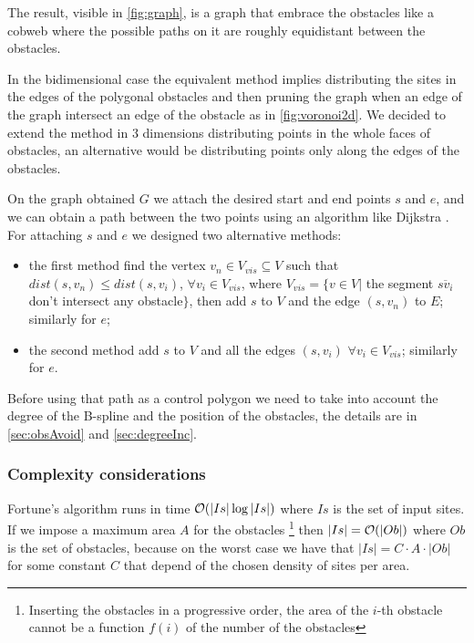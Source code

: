 \documentclass[dissertation.tex]{subfiles}
\begin{document}
The result, visible in \cref{fig:graph}, is a graph that embrace the
obstacles like a cobweb where the possible paths on it are roughly
equidistant between the obstacles.

In the bidimensional case the equivalent method implies distributing
the sites in the edges of the polygonal obstacles and then pruning the
graph when an edge of the graph intersect an edge of the obstacle as
in \cref{fig:voronoi2d}.
We decided to extend the method in 3 dimensions distributing points in
the whole faces of obstacles, an alternative would be distributing
points only along the edges of the obstacles.

On the graph obtained $G$ we attach the desired start and end
points $s$ and $e$, and we can obtain a path between the two points using an
algorithm like Dijkstra \cite{dijkstra}\cite{knuth}. For attaching $s$
and $e$ we designed two
alternative methods:
\begin{itemize}
\item the first method find the vertex $v_n\in V_{vis}\subseteq V$ such
  that $dist(s,v_n)\leq dist(s,v_i)$, $\forall v_i\in V_{vis}$, where
  $V_{vis}=\{v\in V |$ the segment $\overline{s v_i}$ don't intersect
  any obstacle$\}$, then add $s$ to $V$ and the edge $(s,v_n)$ to $E$;
  similarly for $e$;
\item the second method add $s$ to $V$ and all the edges $(s,v_i)$
  $\forall v_i\in V_{vis}$; similarly for $e$.
\end{itemize}

Before using that path as a control polygon
we need to take into account the degree of the B-spline and the
position of the obstacles, the details are in \cref{sec:obsAvoid} and
\cref{sec:degreeInc}.

\subsubsection{Complexity considerations}
Fortune's algorithm runs in time $\mathcal{O}(|Is|\log |Is|)$ \cite{deberg}
where $Is$ is
the set 
of input sites. If we impose a maximum area $A$ for the obstacles
\footnote{Inserting the obstacles in a progressive order, the area of the $i$-th
obstacle cannot be a function $f(i)$ of the number of
the obstacles} then $|Is|=\mathcal{O}(|Ob|)$ where $Ob$ is the set of
obstacles, because on the worst case we have that $|Is|=C\cdot A\cdot
|Ob|$ for
some constant $C$ that depend of the chosen density of sites per area.
\end{document}
